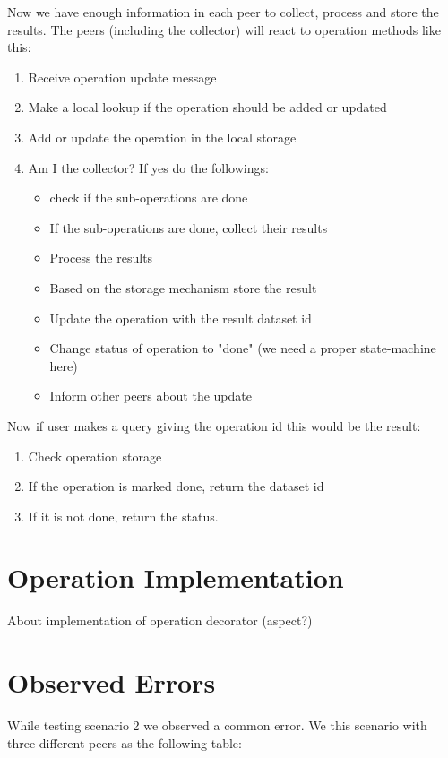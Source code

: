 Now we have enough information in each peer to collect, process and store the results. The peers (including the collector)
 will react to operation methods like this:

\begin{enumerate}
\item Receive operation update message
\item Make a local lookup if the operation should be added or updated
\item Add or update the operation in the local storage
\item Am I the collector? If yes do the followings:
\begin{itemize}
\item check if the sub-operations are done
\item If the sub-operations are done, collect their results
\item Process the results
\item Based on the storage mechanism store the result
\item Update the operation with the result dataset id
\item Change status of operation to "done" (we need a proper state-machine here)
\item Inform other peers about the update
\end{itemize}
\end{enumerate}

Now if user makes a query giving the operation id this would be the result:

\begin{enumerate}
\item Check operation storage
\item If the operation is marked done, return the dataset id
\item If it is not done, return the status.
\end{enumerate}

\section{Operation Implementation}
About implementation of operation decorator (aspect?)

\section{Observed Errors}
While testing scenario 2 we observed a common error. We this scenario with three different peers as the following table:

